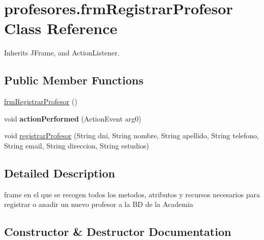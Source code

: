 \hypertarget{classprofesores_1_1frm_registrar_profesor}{}\section{profesores.\+frm\+Registrar\+Profesor Class Reference}
\label{classprofesores_1_1frm_registrar_profesor}


Inherits J\+Frame, and Action\+Listener.

\subsection*{Public Member Functions}
\begin{DoxyCompactItemize}
\item 
\hyperlink{classprofesores_1_1frm_registrar_profesor_a26c147de5dead92fc6ea7c3d72e81c8e}{frm\+Registrar\+Profesor} ()
\item 
\mbox{\label{classprofesores_1_1frm_registrar_profesor_a9d80900dde6262685276e97ed9cee135}} 
void {\bfseries action\+Performed} (Action\+Event arg0)
\item 
void \hyperlink{classprofesores_1_1frm_registrar_profesor_ab91d5a672642a1c1f1a66ab41824eac6}{registrar\+Profesor} (String dni, String nombre, String apellido, String telefono, String email, String direccion, String estudios)
\end{DoxyCompactItemize}


\subsection{Detailed Description}
frame en el que se recogen todos los metodos, atributos y recursos necesarios para registrar o anadir un nuevo profesor a la BD de la Academia 

\subsection{Constructor \& Destructor Documentation}
\mbox{\label{classprofesores_1_1frm_registrar_profesor_a26c147de5dead92fc6ea7c3d72e81c8e}} 
